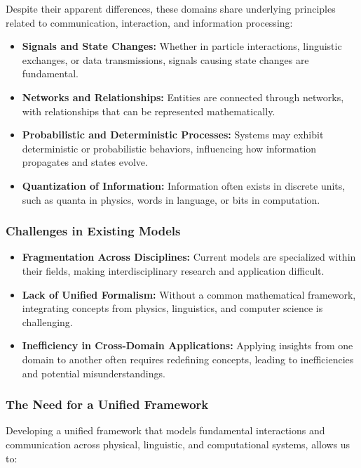 Despite their apparent differences, these domains share underlying principles related to communication, interaction, and information processing:

\begin{itemize}[leftmargin=*, labelsep=5mm]
    \item \textbf{Signals and State Changes:} Whether in particle interactions, linguistic exchanges, or data transmissions, signals causing state changes are fundamental.
    \item \textbf{Networks and Relationships:} Entities are connected through networks, with relationships that can be represented mathematically.
    \item \textbf{Probabilistic and Deterministic Processes:} Systems may exhibit deterministic or probabilistic behaviors, influencing how information propagates and states evolve.
    \item \textbf{Quantization of Information:} Information often exists in discrete units, such as quanta in physics, words in language, or bits in computation.
\end{itemize}

\subsubsection{Challenges in Existing Models}

\begin{itemize}[leftmargin=*, labelsep=5mm]
    \item \textbf{Fragmentation Across Disciplines:} Current models are specialized within their fields, making interdisciplinary research and application difficult.
    \item \textbf{Lack of Unified Formalism:} Without a common mathematical framework, integrating concepts from physics, linguistics, and computer science is challenging.
    \item \textbf{Inefficiency in Cross-Domain Applications:} Applying insights from one domain to another often requires redefining concepts, leading to inefficiencies and potential misunderstandings.
\end{itemize}

\subsubsection{The Need for a Unified Framework}

Developing a unified framework that models fundamental interactions and communication across physical, linguistic, and computational systems, allows us to:

